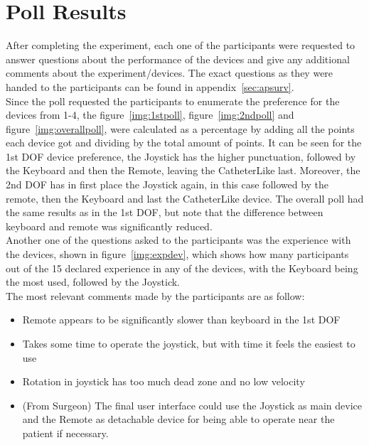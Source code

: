 \section{Poll Results}\label{sec:pollres}
After completing the experiment, each one of the participants were requested to answer questions about the performance of the devices and give any additional comments about the experiment/devices. The exact questions as they were handed to the participants can be found in appendix~\ref{sec:apsurv}.\\

Since the poll requested the participants to enumerate the preference for the devices from 1-4, the figure~\ref{img:1stpoll}, figure~\ref{img:2ndpoll} and figure~\ref{img:overallpoll}, were calculated as a percentage by adding all the points each device got and dividing by the total amount of points. It can be seen for the 1st DOF device preference, the Joystick has the higher punctuation, followed by the Keyboard and then the Remote, leaving the CatheterLike last. Moreover, the 2nd DOF has in first place the Joystick again, in this case followed by the remote, then the Keyboard and last the CatheterLike device. The overall poll had the same results as in the 1st DOF, but note that the difference between keyboard and remote was significantly reduced.\\

Another one of the questions asked to the participants was the experience with the devices, shown in figure~\ref{img:expdev}, which shows how many participants out of the 15 declared experience in any of the devices, with the Keyboard being the most used, followed by the Joystick.\\

The most relevant comments made by the participants are as follow:
\begin{itemize}
 \item  Remote appears to be significantly slower than keyboard in the 1st DOF
 \item Takes some time to operate the joystick, but with time it feels the easiest to use
 \item Rotation in joystick has too much dead zone and no low velocity
 \item 	(From Surgeon) The final user interface could use the Joystick as main device and the Remote as detachable device for being able to operate near the patient if necessary.\\
\end{itemize}


